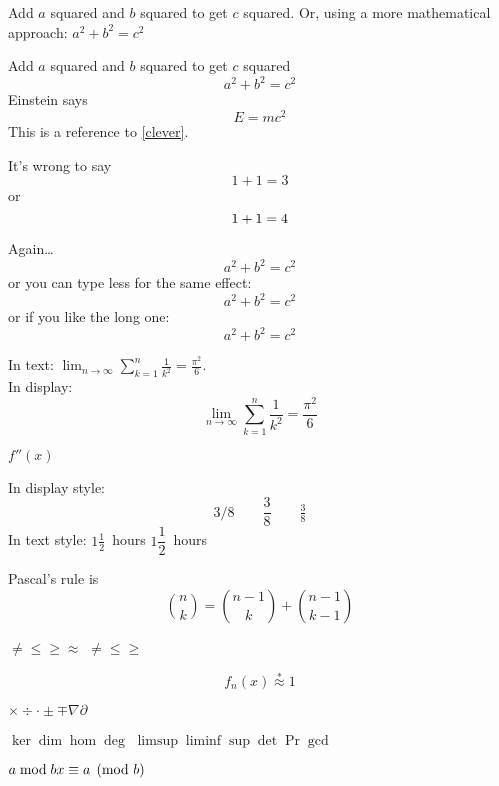 \documentclass{article}
\begin{document}
	Add $a$ squared and $b$ squared
	to get $c$ squared. Or, using
	a more mathematical approach:
	$a^2 + b^2 = c^2$
	
	
	Add $a$ squared and $b$ squared
	to get $c$ squared
	\begin{equation}
	a^2 + b^2 = c^2
	\end{equation}
	Einstein says
	\begin{equation}
	E = mc^2 \label{clever}
	\end{equation}
	This is a reference to
	\eqref{clever}.
	
	
	It’s wrong to say
	\begin{equation}
	1 + 1 = 3 \tag{dumb}
	\end{equation}
	or
	\begin{equation}
	1 + 1 = 4 \notag
	\end{equation}
	
	
	Again\ldots
	\begin{equation*}
	a^2 + b^2 = c^2
	\end{equation*}
	or you can type less for the
	same effect:
	\[ a^2 + b^2 = c^2 \]
	or if you like the long one:
	\begin{displaymath}
	a^2 + b^2 = c^2
	\end{displaymath}
	
	
	In text:
	$\lim_{n \to \infty}
	\sum_{k=1}^n \frac{1}{k^2}
	= \frac{\pi^2}{6}$.\\
	In display:
	\[
	\lim_{n \to \infty}
	\sum_{k=1}^n \frac{1}{k^2}
	= \frac{\pi^2}{6}
	\]
	
	
	$f''(x)$
	
	In display style:
	\[
	3/8 \qquad \frac{3}{8}
	\qquad \tfrac{3}{8}
	\]
	In text style:
	$1\frac{1}{2}$~hours \qquad
	$1\dfrac{1}{2}$~hours
	
	
	Pascal’s rule is
	\[
	\binom{n}{k} =\binom{n-1}{k}
	+ \binom{n-1}{k-1}
	\]
	
	$\ne  \le \ge \approx$
	$\neq \leq \geq$
	
	\[
	f_n(x) \stackrel{*}{\approx} 1
	\]
	
	$\times \div \cdot \pm \mp \nabla \partial$
	
	$\ker \dim \hom \deg$
	$\limsup \liminf \sup \det \Pr \gcd$
	
	$a\bmod b\\
	x\equiv a\pmod{b}$
	
\end{document}
